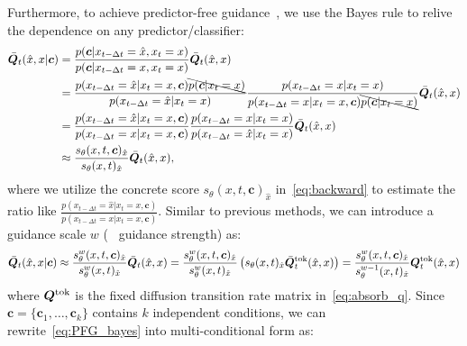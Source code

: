 Furthermore, to achieve predictor-free guidance~\cite{CFG/abs-2207-12598,CFG_DDM:journals/corr/abs-2406-01572}, we use the Bayes rule to relive the dependence on any predictor/classifier: 
\begin{equation}
\label{eq:PFG_bayes}
\begin{aligned}
\bar{{\bm{Q}}}_t(\hat{x},x|\bm{c}) &= \frac{p(\bm{c} | x_{t-\Delta t}=\hat{x}, x_{t}=x )}{p(\bm{c} | x_{t-\Delta t}={x}, x_{t}=x )} \bar{{\bm{Q}}}_t(\hat{x},x)\\
&= \frac{p(x_{t-\Delta t}=\hat{x}|x_{t}=x,\bm{c})\bcancel{p(\bm{c}|x_t=x)}}{p(x_{t-\Delta t}=\hat{x}|x_{t}=x)} \frac{p(x_{t-\Delta t}=x|x_{t}=x)}{p(x_{t-\Delta t}=x|x_{t}=x,\bm{c})\bcancel{p(\bm{c}|x_t=x)}}\bar{{\bm{Q}}}_t(\hat{x},x)\\
&= \frac{p(x_{t-\Delta t}=\hat{x}|x_{t}=x,\bm{c})}{p(x_{t-\Delta t}=x|x_{t}=x,\bm{c})}\frac{p(x_{t-\Delta t}=x|x_{t}=x)}{p(x_{t-\Delta t}=\hat{x}|x_{t}=x)}\bar{{\bm{Q}}}_t(\hat{x},x)\\
&\approx \frac{s_\theta(x,t,\bm{c})_{\hat{x}}}{s_\theta(x,t)_{\hat{x}}}\bar{{\bm{Q}}}_t(\hat{x},x),
\end{aligned}
\end{equation}
where we utilize the concrete score $s_\theta(x,t,\bm{c})_{\hat{x}}$ in~\cref{eq:backward} to estimate the ratio like $\frac{p(x_{t-\Delta t}=\hat{x}|x_{t}=x,\bm{c})}{p(x_{t-\Delta t}=x|x_{t}=x,\bm{c})}$. Similar to previous methods, we can introduce a guidance scale $w$ (\ie~ guidance strength) as:
\begin{equation}
\label{eq:PFG_bayes1}
\begin{aligned}
\bar{{\bm{Q}}}_t(\hat{x},x|\bm{c})\approx {\frac{s^w_\theta(x,t,\bm{c})_{\hat{x}}}{s^w_\theta(x,t)_{\hat{x}}}}\bar{{\bm{Q}}}_t(\hat{x},x)={\frac{s^w_\theta(x,t,\bm{c})_{\hat{x}}}{s^w_\theta(x,t)_{\hat{x}}}}\left(s_\theta(x,t)_{\hat{x}}\bar{{\bm{Q}}}^\text{tok}_t(\hat{x},x)\right)={\frac{s^w_\theta(x,t,\bm{c})_{\hat{x}}}{s^{w-1}_\theta(x,t)_{\hat{x}}}}{\bm{Q}}^\text{tok}_t(\hat{x},x)
\end{aligned}
\end{equation}
where ${\bm{Q}}^\text{tok}$ is the fixed diffusion transition rate matrix in~\cref{eq:absorb_q}. 
Since $\bm{c} = \{\bm{c}_1,\ldots,\bm{c}_k\}$ contains $k$ independent conditions, we can rewrite~\cref{eq:PFG_bayes} into multi-conditional form as:
